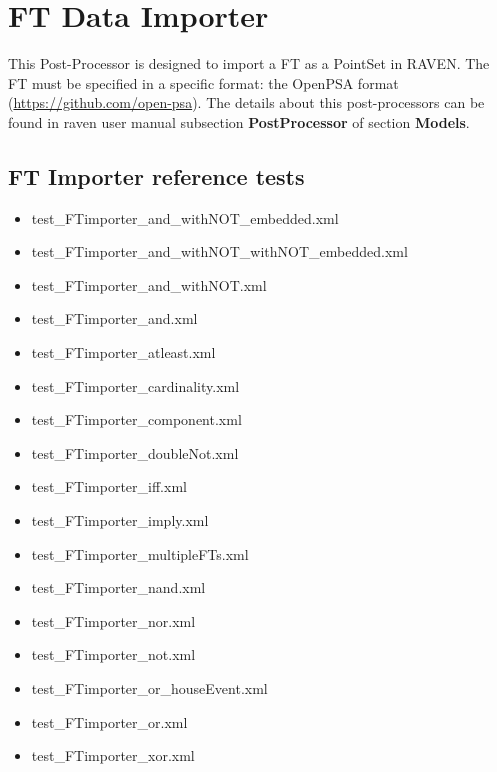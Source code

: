 \section{FT Data Importer}
\label{sec:FTdataImporter}

This Post-Processor is designed to import a FT as a PointSet in RAVEN.
The FT must be specified in a specific format: the OpenPSA format (\href{<url>}{https://github.com/open-psa}). 
The details about this post-processors can be found in raven user manual subsection \textbf{PostProcessor}
of section \textbf{Models}.

\subsection{FT Importer reference tests}
\begin{itemize}
	\item test\_FTimporter\_and\_withNOT\_embedded.xml
	\item test\_FTimporter\_and\_withNOT\_withNOT\_embedded.xml
	\item test\_FTimporter\_and\_withNOT.xml
	\item test\_FTimporter\_and.xml
	\item test\_FTimporter\_atleast.xml
	\item test\_FTimporter\_cardinality.xml
	\item test\_FTimporter\_component.xml
	\item test\_FTimporter\_doubleNot.xml
	\item test\_FTimporter\_iff.xml
	\item test\_FTimporter\_imply.xml
	\item test\_FTimporter\_multipleFTs.xml
	\item test\_FTimporter\_nand.xml
	\item test\_FTimporter\_nor.xml
	\item test\_FTimporter\_not.xml
	\item test\_FTimporter\_or\_houseEvent.xml
	\item test\_FTimporter\_or.xml
	\item test\_FTimporter\_xor.xml
\end{itemize}

